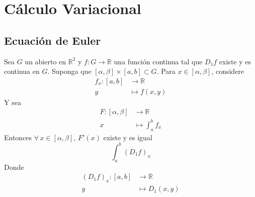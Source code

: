 \section{Cálculo Variacional}
\subsection{Ecuación de Euler}
\begin{proposition}
  Sea $G$ un abierto en $\mathbb{R}^2$ y $f:G \to \mathbb{R}$ una función
  continua tal que $D_1f$ existe y es continua en $G$. Suponga que $[\alpha,
  \beta] \times [a,b] \subset G$. Para $x \in [\alpha,\beta]$, considere 
  \begin{align*}
    f_x:[a,b] &\to \mathbb{R} \\
    y &\mapsto f(x,y)
  \end{align*}
  Y sea 
  \begin{align*}
    F: [\alpha, \beta] &\to \mathbb{R} \\
    x &\mapsto \int^b_{a} f_x
  \end{align*}
  Entonces $\forall \, x \in [\alpha, \beta]$, $F'(x) $ existe y es igual 
  \[
    \int_a^b (D_1f)_x
  \]
  Donde 
  \begin{align*}
    (D_1f)_x : [a,b] &\to \mathbb{R} \\
    y &\mapsto D_1(x,y)
  \end{align*}
\end{proposition}
